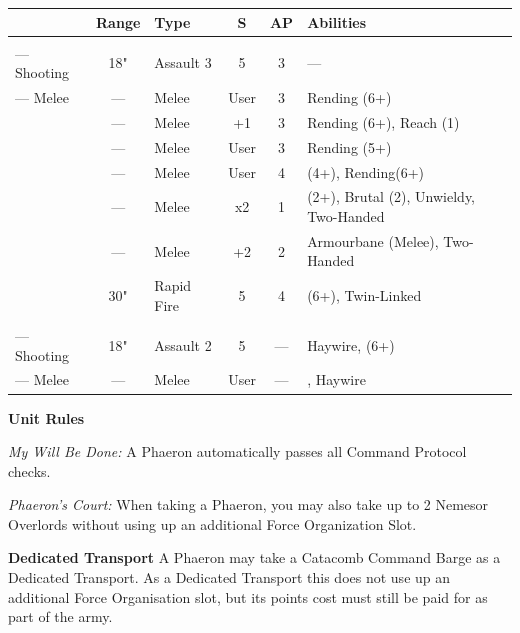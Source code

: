 \begin{minipage}[t][\textheight][t]{0.72\textwidth}
	\begin{tabular}{L{90 pt} c C{40pt} *{2}{c} >{\raggedright\arraybackslash}p{130pt}}
		& Range & Type & S & AP & Abilities \\
		\hline
		 & & &  &  &  \\
		— Shooting & 18" & Assault 3 & 5 & 3 & — \\
		— Melee & — & Melee & User & 3 & Rending (6+) \\
		 & — & Melee & +1 & 3 & Rending (6+), Reach (1) \\
		 & — & Melee & User & 3 & Rending (5+) \\
		 & — & Melee & User & 4 &  (4+), Rending(6+) \\
		 & — & Melee & x2 & 1 &  (2+), Brutal (2), Unwieldy, Two-Handed \\
		 & — & Melee & +2 & 2 & Armourbane (Melee), Two-Handed \\
		 & 30" & Rapid Fire & 5 & 4 &  (6+), Twin-Linked \\	
		 & & &  &  &  \\
		— Shooting & 18" & Assault 2 & 5 & — & Haywire,  (6+) \\
		— Melee & — & Melee & User & — & , Haywire \\
	\end{tabular}
	
	\vspace*{2em}
	\textbf{Unit Rules}
	
	\textit{My Will Be Done:} A Phaeron automatically passes all Command Protocol checks.
	
	\textit{Phaeron's Court:} When taking a Phaeron, you may also take up to 2 Nemesor Overlords without using up an additional Force Organization Slot. 
	
	\vspace*{2em}
	\textbf{Dedicated Transport}
	A Phaeron may take a Catacomb Command Barge as a Dedicated Transport. As a Dedicated Transport this does not use up an additional Force Organisation slot, but its points cost must still be paid for as part of the army.
\end{minipage}
\hspace{0.5em}

